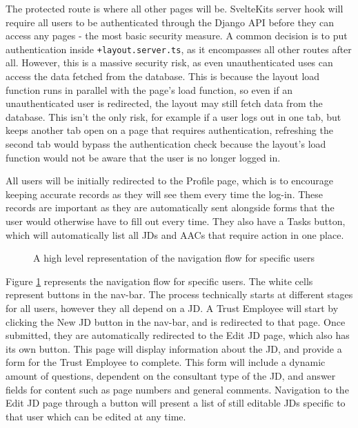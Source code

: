 The protected route is where all other pages will be. SvelteKits server hook will require all users to be authenticated through the Django API before they can access any pages - the most basic security measure. A common decision is to put authentication inside \texttt{+layout.server.ts}, as it encompasses all other routes after all. However, this is a massive security risk, as even unauthenticated uses can access the data fetched from the database. This is because the layout load function runs in parallel with the page's load function, so even if an unauthenticated user is redirected, the layout may still fetch data from the database. This isn't the only risk, for example if a user logs out in one tab, but keeps another tab open on a page that requires authentication, refreshing the second tab would bypass the authentication check because the layout's load function would not be aware that the user is no longer logged in.

All users will be initially redirected to the Profile page, which is to encourage keeping accurate records as they will see them every time the log-in. These records are important as they are automatically sent alongside forms that the user would otherwise have to fill out every time. They also have a Tasks button, which will automatically list all JDs and AACs that require action in one place.

\begin{figure}[h]
\centering
{}
\vspace{-5pt}
\caption{A high level representation of the navigation flow for specific users}
\label{fig:ui-role}
\end{figure}
\vspace{-5pt}

Figure \ref{fig:ui-role} represents the navigation flow for specific users. The white cells represent buttons in the nav-bar. The process technically starts at different stages for all users, however they all depend on a JD. A Trust Employee will start by clicking the New JD button in the nav-bar, and is redirected to that page. Once submitted, they are automatically redirected to the Edit JD page, which also has its own button. This page will display information about the JD, and provide a form for the Trust Employee to complete. This form will include a dynamic amount of questions, dependent on the consultant type of the JD, and answer fields for content such as page numbers and general comments. Navigation to the Edit JD page through a button will present a list of still editable JDs specific to that user which can be edited at any time.

